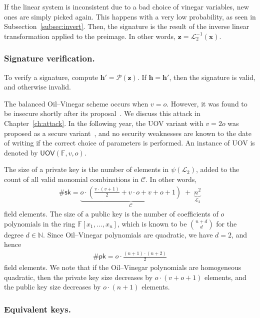 \documentclass[12pt, a4paper, oneside]{memoir}
\theoremstyle{definition}
\begin{document}
If the linear system is inconsistent due to a bad choice of vinegar variables, new ones are simply picked again. This happens with a very low probability, as seen in Subsection~\ref{subsec:invert}. Then, the signature is the result of the inverse linear transformation applied to the preimage. In other words, $\mathbf{z} = \mathcal{L}_{2}^{-1}(\mathbf{x})$.

\subsubsection{Signature verification.}

To verify a signature, compute $\mathbf{h'} = \mathcal{P}(\mathbf{z})$. If $\mathbf{h} = \mathbf{h'}$, then the signature is valid, and otherwise invalid.

The balanced Oil--Vinegar scheme occurs when $v = o$. However, it was found to be insecure shortly after its proposal~\cite{Kipnis:199808}. We discuss this attack in Chapter~\ref{ch:attack}. In the following year, the UOV variant with $v = 2o$ was proposed as a secure variant~\cite{Kipnis:199904}, and no security weaknesses are known to the date of writing if the correct choice of parameters is performed. An instance of UOV is denoted by $\mathsf{UOV}(\mathbb{F}, v, o)$. 

The size of a private key is the number of elements in $\psi(\mathcal{L}_{2})$, added to the count of all valid monomial combinations in $\mathcal{C}$. In other words,
\begin{align}
  \#\mathsf{sk} = \underbrace{o \cdot \left( \frac{v \cdot (v + 1)}{2} + v \cdot o + v + o + 1 \right)}_{\mathcal{C}} \;
    + \; \underbrace{n^{2}}_{\mathcal{L}_{2}}
\end{align}
field elements. The size of a public key is the number of coefficients of $o$ polynomials in the ring $\mathbb{F}[x_{1}, \dots, x_{n}]$, which is known to be $\binom{n + d}{d}$ for the degree $d \in \mathbb{N}$. Since Oil--Vinegar polynomials are quadratic, we have $d = 2$, and hence
\begin{align}
  \#\mathsf{pk} = o \cdot \frac{(n + 1) \cdot (n + 2)}{2}
\end{align}
field elements. We note that if the Oil--Vinegar polynomials are homogeneous quadratic, then the private key size decreases by $o \cdot (v + o + 1)$ elements, and the public key size decreases by $o \cdot (n + 1)$ elements.

\subsubsection{Equivalent keys.}
\end{document}
